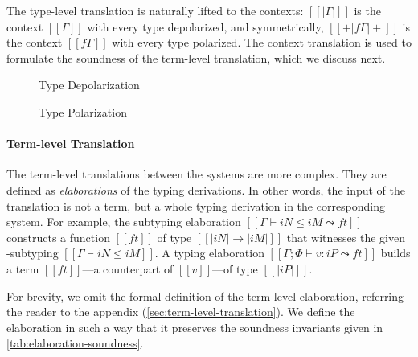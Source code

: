 The type-level translation is naturally lifted to the contexts:
$[[|Γ|]]$ is the context $[[Γ]]$ with every type depolarized,
and symmetrically, $[[+|fΓ|+]]$ is the context $[[fΓ]]$ with every type polarized.
The context translation is used to formulate the soundness of the
 term-level translation, which we discuss next.


\begin{figure}[t]
  \begin{minipage}[t]{0.60\linewidth}
    \centering
      \begin{minipage}[t]{0.30\linewidth}
      \ottfundefnunpolP{}
      \end{minipage}
      \hspace{0.5cm}
      \begin{minipage}[t]{0.30\linewidth}
      \ottfundefnunpolN{}
      \end{minipage}
    \caption{Type Depolarization \protect\footnotemark}
    \label{fig:depolarization}
  \end{minipage}
  \hspace{0.3cm}
  \begin{minipage}[t]{0.3\linewidth}
    \centering
    \ottfundefnpolarP{}
    \caption{Type Polarization}
    \label{fig:polarization}
  \end{minipage}
\end{figure}



\paragraph*{Term-level Translation}

The term-level translations between the systems are more complex. They are
defined as \emph{elaborations} of the typing derivations. In other words, the
input of the translation is not a term, but a whole typing derivation in the
corresponding system. For example, the subtyping elaboration $[[Γ ⊢ iN ≤ iM ⤳
ft]]$ constructs a \systemf function $[[ft]]$ of type $[[|iN| → |iM|]]$ that
witnesses the given \fexists-subtyping $[[Γ ⊢ iN ≤ iM]]$. A typing elaboration
$[[Γ; Φ ⊢ v : iP ⤳ ft]]$ builds a term $[[ft]]$---a \systemf counterpart of
$[[v]]$---of type $[[|iP|]]$.

For brevity, we omit the formal definition of the term-level elaboration,
referring the reader to the appendix (\cref{sec:term-level-translation}). We define
the elaboration in such a way that it preserves the soundness invariants given
in \cref{tab:elaboration-soundness}. 

